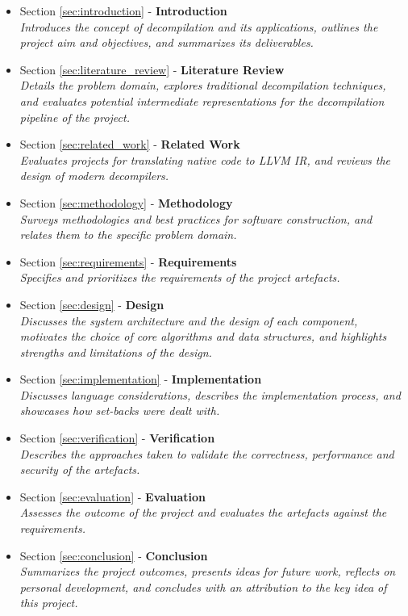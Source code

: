 \begin{itemize}
	\item Section \ref{sec:introduction} - \textbf{Introduction} \\ \textit{Introduces the concept of decompilation and its applications, outlines the project aim and objectives, and summarizes its deliverables.}
	\item Section \ref{sec:literature_review} - \textbf{Literature Review} \\ \textit{Details the problem domain, explores traditional decompilation techniques, and evaluates potential intermediate representations for the decompilation pipeline of the project.}
	\item Section \ref{sec:related_work} - \textbf{Related Work} \\ \textit{Evaluates projects for translating native code to LLVM IR, and reviews the design of modern decompilers.}
	\item Section \ref{sec:methodology} - \textbf{Methodology} \\ \textit{Surveys methodologies and best practices for software construction, and relates them to the specific problem domain.}
	\item Section \ref{sec:requirements} - \textbf{Requirements} \\ \textit{Specifies and prioritizes the requirements of the project artefacts.}
	\item Section \ref{sec:design} - \textbf{Design} \\ \textit{Discusses the system architecture and the design of each component, motivates the choice of core algorithms and data structures, and highlights strengths and limitations of the design.}
	\item Section \ref{sec:implementation} - \textbf{Implementation} \\ \textit{Discusses language considerations, describes the implementation process, and showcases how set-backs were dealt with.}
	\item Section \ref{sec:verification} - \textbf{Verification} \\ \textit{Describes the approaches taken to validate the correctness, performance and security of the artefacts.}
	\item Section \ref{sec:evaluation} - \textbf{Evaluation} \\ \textit{Assesses the outcome of the project and evaluates the artefacts against the requirements.}
	\item Section \ref{sec:conclusion} - \textbf{Conclusion} \\ \textit{Summarizes the project outcomes, presents ideas for future work, reflects on personal development, and concludes with an attribution to the key idea of this project.}
\end{itemize}
